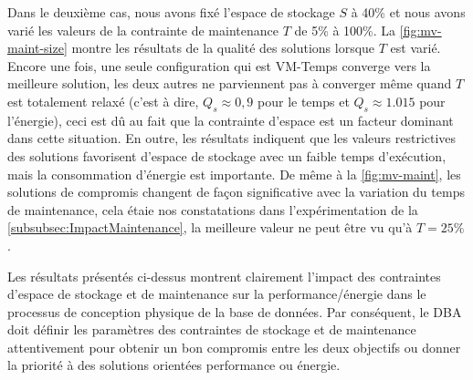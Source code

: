 Dans le deuxième cas, nous avons fixé l'espace de stockage $S$ à 40\% et nous avons varié les valeurs de la contrainte de maintenance $T$ de 5\% à 100\%. La \ref{fig:mv-maint-size} montre les résultats de la qualité des solutions lorsque $T$ est varié. Encore une fois, une seule configuration qui est VM-Temps converge vers la meilleure solution, les deux autres ne parviennent pas à converger même quand $T$ est totalement relaxé (c'est à dire, $Q_s \approx 0,9$ pour le temps et $Q_s \approx 1.015$ pour l'énergie), ceci est dû au fait que la contrainte d'espace est un facteur dominant dans cette situation. En outre, les résultats indiquent que les valeurs restrictives des solutions favorisent d'espace de stockage avec un faible temps d'exécution, mais la consommation d'énergie est importante. De même à la \ref{fig:mv-maint}, les solutions de compromis changent de façon significative avec la variation du temps de maintenance, cela étaie nos constatations dans l'expérimentation de la \ref{subsubsec:ImpactMaintenance}, la meilleure valeur ne peut être vu qu'à $T = 25\%$.

Les résultats présentés ci-dessus montrent clairement l'impact des contraintes d'espace de stockage et de maintenance sur la performance/énergie dans le processus de conception physique de la base de données. Par conséquent, le DBA doit définir les paramètres des contraintes de stockage et de maintenance attentivement pour obtenir un bon compromis entre les deux objectifs ou donner la priorité à des solutions orientées performance ou énergie.

